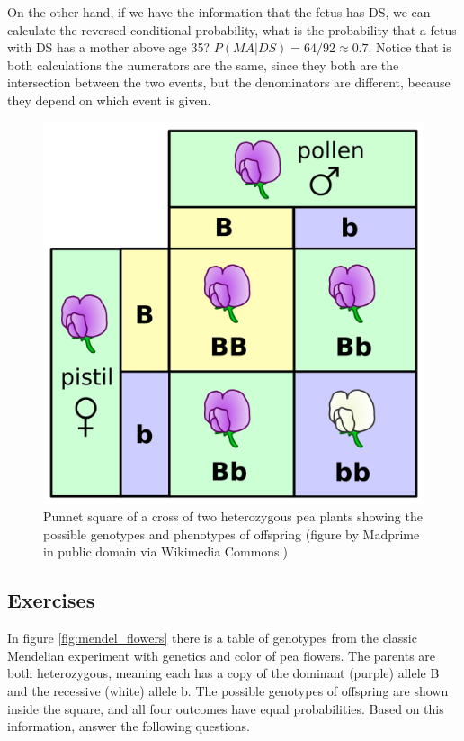 \documentclass[
]{book}
\theoremstyle{definition}
\theoremstyle{definition}
\theoremstyle{definition}
\theoremstyle{remark}
\begin{document}
On the other hand, if we have the information that the fetus has DS, we can calculate the reversed conditional probability, what is the probability that a fetus with DS has a mother above age 35? \(P(MA | DS) = 64/92 \approx 0.7\). Notice that is both calculations the numerators are the same, since they both are the intersection between the two events, but the denominators are different, because they depend on which event is given.

\begin{figure}
\centering
\includegraphics{ch6/mendel_flowers.png}
\caption{Punnet square of a cross of two heterozygous pea plants showing the possible genotypes and phenotypes of offspring (figure by Madprime in public domain via Wikimedia Commons.)}
\end{figure}

\hypertarget{exercises-23}{%
\subsection{Exercises}\label{exercises-23}}

In figure \ref{fig:mendel_flowers} there is a table of genotypes from the classic Mendelian experiment with genetics and color of pea flowers. The parents are both heterozygous, meaning each has a copy of the dominant (purple) allele B and the recessive (white) allele b. The possible genotypes of offspring are shown inside the square, and all four outcomes have equal probabilities. Based on this information, answer the following questions.
\end{document}
